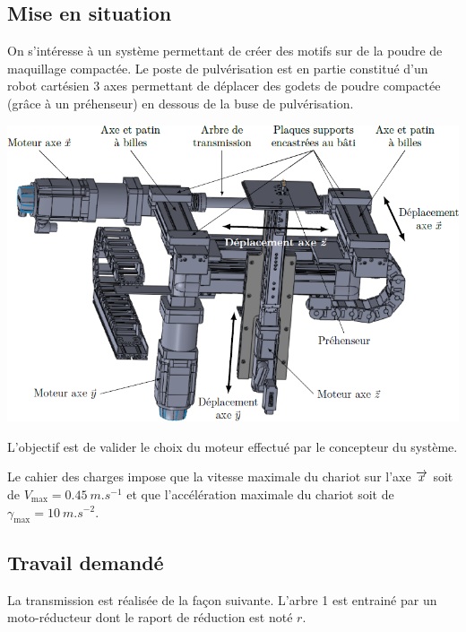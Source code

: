 \documentclass[10pt,fleqn]{article} %
\begin{document}

\vspace{4.5cm}
\pagestyle{fancy}
\thispagestyle{plain}


\def\columnseprulecolor{\color{ocre}}
\setlength{\columnseprule}{0.4pt} 

\begin{multicols}{2}
\section*{Mise en situation}
\ifprof
\else
On s'intéresse à un système permettant de créer des motifs sur de la poudre de maquillage compactée. Le poste de pulvérisation est en partie constitué d'un robot cartésien 3 axes permettant de déplacer des godets de poudre compactée (grâce à un préhenseur) en dessous de la buse de pulvérisation. 

\begin{center}
\includegraphics[width=\linewidth]{images/fig_02}
\end{center}

\fi

\begin{obj}
L’objectif est de valider le choix du moteur effectué par le concepteur du système.

Le cahier des charges impose que la vitesse maximale du chariot sur l’axe $\overrightarrow{x}$ soit de $V_{\text{max}}= \SI{0,45}{m.s^{-1}}$ et que l’accélération maximale du chariot soit de $\gamma_{\text{max}}= \SI{10}{m.s^{-2}}$.
\end{obj}

\subsection*{Travail demandé}
La transmission est réalisée de la façon suivante. L'arbre 1 est entrainé par un moto-réducteur dont le raport de réduction est noté $r$. 


\end{multicols}
\end{document}

